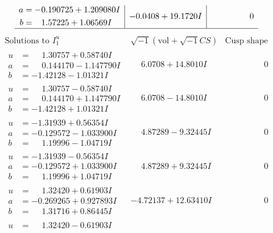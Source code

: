 \documentclass[1p]{elsarticle_modified}
\theoremstyle{definition}
\newcommand{\I}{\sqrt{-1}}
\begin{document}
$$\begin{array}{c|c|c}
\begin{aligned}
a &= -0.190725 + 1.209080 I \\
b &= \phantom{-}1.57225 + 1.06569 I\end{aligned}
 & -0.0408 + 19.1720 I & \phantom{-0.000000 } 0\\
 \hline 
 \end{array}$$\newpage$$\begin{array}{c|c|c}  
\text{Solutions to }I^u_{1}& \I (\text{vol} + \sqrt{-1}CS) & \text{Cusp shape}\\
 \hline 
\begin{aligned}
u &= \phantom{-}1.30757 + 0.58740 I \\
a &= \phantom{-}0.144170 - 1.147790 I \\
b &= -1.42128 - 1.01321 I\end{aligned}
 & \phantom{-}6.0708 + 14.8010 I & \phantom{-0.000000 } 0 \\ \hline\begin{aligned}
u &= \phantom{-}1.30757 - 0.58740 I \\
a &= \phantom{-}0.144170 + 1.147790 I \\
b &= -1.42128 + 1.01321 I\end{aligned}
 & \phantom{-}6.0708 - 14.8010 I & \phantom{-0.000000 } 0 \\ \hline\begin{aligned}
u &= -1.31939 + 0.56354 I \\
a &= -0.129572 - 1.033900 I \\
b &= \phantom{-}1.19996 - 1.04719 I\end{aligned}
 & \phantom{-}4.87289 - 9.32445 I & \phantom{-0.000000 } 0 \\ \hline\begin{aligned}
u &= -1.31939 - 0.56354 I \\
a &= -0.129572 + 1.033900 I \\
b &= \phantom{-}1.19996 + 1.04719 I\end{aligned}
 & \phantom{-}4.87289 + 9.32445 I & \phantom{-0.000000 } 0 \\ \hline\begin{aligned}
u &= \phantom{-}1.32420 + 0.61903 I \\
a &= -0.269265 + 0.927893 I \\
b &= \phantom{-}1.31716 + 0.86445 I\end{aligned}
 & -4.72137 + 12.63410 I & \phantom{-0.000000 } 0 \\ \hline\begin{aligned}
u &= \phantom{-}1.32420 - 0.61903 I \\

\end{aligned}
\end{array}$$
\end{document}
